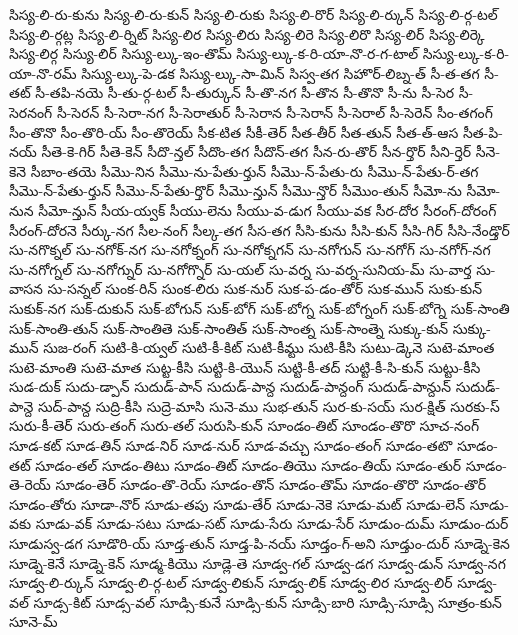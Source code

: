 {సిస్య-లి-రు-కును
సిస్య-లి-రు-కున్
సిస్య-లి-రుకు
సిస్య-లి-రొర్
సిస్య-లి-ర్కున్
సిస్య-లి-ర్గ-టల్
సిస్య-లి-ర్గట్ల
సిస్య-లి-ర్నిట్
సిస్య-లిర
సిస్య-లిరు
సిస్య-లిరె
సిస్య-లిరొ
సిస్య-లిర్
సిస్య-లిర్కె
సిస్య-లిర్గ
సిస్యు-లిర్
సిస్యు-ల్కు-ఇం-తొమ్
సిస్యు-ల్కు-క-రి-యా-నొ-ర-గ-టాల్
సిస్యు-ల్కు-క-రి-యా-నొ-రమ్
సిస్యు-ల్కు-పె-డక
సిస్యు-ల్కు-సా-మిన్
సిస్వ-తగ
సిహొర్-లిబ్న-త్
సీ-త-తగ
సీ-తట్
సీ-తపి-నయె
సీ-తు-ర్గ-టల్
సీ-తుర్కున్
సీ-తొ-నగ
సీ-తొన
సీ-తొనొ
సీ-ను
సీ-సెర
సీ-సెరనంగ్
సీ-సెరన్
సీ-సెరా-నగ
సీ-సెరాతుర్
సీ-సెరాన
సీ-సెరాన్
సీ-సెరాల్
సీ-సెరెన్
సీం-తగంగ్
సీం-తొనొ
సీం-తొరి-య్
సీం-తొరెయ్
సీక-టిత
సీకీ-తెర్
సీత-తీర్
సీత-తున్
సీత-త్-ఆస
సీత-పి-నయ్
సీతె-కె-గిర్
సీతె-కెన్
సీదొ-న్తల్
సీదొం-తగ
సీదొన్-తగ
సీన-రు-తొర్
సీన-ర్తొర్
సీని-ర్తెర్
సీనె-కెనె
సీబాం-తయె
సీమొ-నిన
సీమొ-ను-పేతు-ర్తున్
సీమొ-న్-పేతు-రు
సీమొ-న్-పేతు-ర్-తగ
సీమొ-న్-పేతు-ర్తున్
సీమొ-న్-పేతు-ర్తొర్
సీమొ-న్తున్
సీమొ-న్తొర్
సీమొం-తున్
సీమో-ను
సీమో-నున
సీమో-న్తున్
సీయ-య్వక్
సీయు-లెను
సీయు-వ-డుగ
సీయు-వక
సీర-దోర
సీరంగ్-దోరంగ్
సీరంగ్-దోరనె
సీర్కు-నగ
సీల-నంగ్
సీల్క-తగ
సీస-తగ
సీసి-కును
సీసి-కున్
సీసి-గిర్
సీసి-నేండ్తొర్
సు-నగొక్నల్
సు-నగోక్-నగ
సు-నగోక్నంగ్
సు-నగోక్నగన్
సు-నగోగున్
సు-నగోగ్
సు-నగోగ్-నగ
సు-నగోగ్నల్
సు-నగోగ్నుర్
సు-నగోగ్నొర్
సు-యల్
సు-వర్న
సు-వర్న-సునియ-మ్
సు-వార్త
సు-వాసన
సు-సన్నల్
సుంక-రిన్
సుంక-లిరు
సుక-నుర్
సుక-ప-డం-తోర్
సుక-మున్
సుకు-కున్
సుకుక్-నగ
సుక్-దుకున్
సుక్-బోగున్
సుక్-బోగ్
సుక్-బోగ్న
సుక్-బోగ్నంగ్
సుక్-బోగ్నె
సుక్-సాంతి
సుక్-సాంతి-తున్
సుక్-సాంతితె
సుక్-సాంతిత్
సుక్-సాంత్న
సుక్-సాంత్నె
సుక్కు-కున్
సుక్కు-మున్
సుజ-రంగ్
సుటి-కి-య్వల్
సుటి-కీ-కిట్
సుటి-కీమ్టు
సుటి-కీసి
సుటు-డ్కెనె
సుటె-మాంత
సుటె-మాంతి
సుటె-మాత
సుట్ట-కీసి
సుట్టి-కి-యొన్
సుట్టి-కీ-తద్
సుట్టి-కీ-సి-కున్
సుట్టు-కీసి
సుడ-దుక్
సుదు-డ్పాన్
సుదుడ్-పాన్
సుదుడ్-పాన్ద
సుదుడ్-పాన్దంగ్
సుదుడ్-పాన్దున్
సుదుడ్-పాన్దె
సుద్-పాన్ద
సుద్రి-కీసి
సుద్రె-మాసి
సునె-ము
సుభ-తున్
సుర-కు-సయ్
సుర-క్షిత్
సురకు-స్
సురు-కీ-తెర్
సురు-తంగ్
సురు-తల్
సురుసి-కున్
సూండం-తిట్
సూండం-తొరొ
సూచ-నంగ్
సూడ-కట్
సూడ-తిన్
సూడ-నిర్
సూడ-నుర్
సూడ-వచ్చు
సూడం-తంగ్
సూడం-తటొ
సూడం-తట్
సూడం-తల్
సూడం-తిటు
సూడం-తిట్
సూడం-తియొ
సూడం-తియ్
సూడం-తుర్
సూడం-తె-రెయ్
సూడం-తెర్
సూడం-తొ-రెయ్
సూడం-తొన్
సూడం-తొమ్
సూడం-తొరొ
సూడం-తొర్
సూడం-తోరు
సూడా-నొర్
సూడు-తపు
సూడు-తేర్
సూడు-నెకె
సూడు-మట్
సూడు-లెన్
సూడు-వకు
సూడు-వక్
సూడు-సటు
సూడు-సట్
సూడు-సేరు
సూడు-సేర్
సూడుం-దుమ్
సూడుం-దుర్
సూడుస్వ-డగ
సూడొరి-య్
సూడ్త-తున్
సూడ్త-పి-నయ్
సూడ్తం-గ్-అని
సూడ్తుం-దుర్
సూడ్నె-కెన
సూడ్నె-కెనే
సూడ్నె-కెన్
సూడ్మ-కియొ
సూడ్లె-తె
సూడ్వ-గల్
సూడ్వ-డగ
సూడ్వ-డున్
సూడ్వ-నగ
సూడ్వ-లి-ర్కున్
సూడ్వ-లి-ర్గ-టల్
సూడ్వ-లికున్
సూడ్వ-లిక్
సూడ్వ-లిర
సూడ్వ-లిర్
సూడ్వ-వల్
సూడ్స-కిట్
సూడ్స-వల్
సూడ్సి-కునే
సూడ్సి-కున్
సూడ్సి-బారి
సూడ్సి-సూడ్సి
సూత్రం-కున్
సూనె-మ్
}
